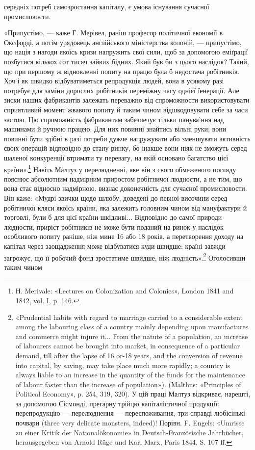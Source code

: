 \parcont{}  %
середніх потреб самозростання капіталу, є умова існування сучасної
промисловости.

«Припустімо, — каже Г. Мерівел, раніш професор політичної
економії в Оксфорді, а потім урядовець англійського міністерства
колоній, — припустімо, що нація з нагоди якоїсь кризи напружить
свої сили, щоб за допомогою еміґрації позбутися кількох сот
тисяч зайвих бідних. Який був би з цього наслідок? Такий, що
при першому ж відновленні попиту на працю була б недостача
робітників. Хоч і як швидко відбуватиметься репродукція людей,
вона в усякому разі потребує для заміни дорослих робітників
переміжну часу однієї їенерації. Але зиски наших фабрикантів
залежать переважно від спроможности використовувати сприятливий
момент жвавого попиту й таким чином відшкодовувати
себе за часи застою. Цю спроможність фабрикантам забезпечує
тільки панува'ння над машинами й ручною працею. Для них
повинні знайтись вільні руки; вони повинні бути здібні в разі
потреби дужче напружувати або зменшувати активність своїх
операцій відповідно до стану ринку, бо інакше вони ніяк не зможуть
серед шаленої конкуренції втримати ту перевагу, на якій
основано багатство цієї країни».\footnote{
Н. Merivale: «Lectures on Colonization and Colonies», London 1841
and 1842, vol. I, p. 146.
} Навіть Малтуз у перелюдненні,
яке він з свого обмеженого погляду пояснює абсолютним
надмірним приростом робітничої людности, а не тим, що вона
стає відносно надмірною, визнає доконечність для сучасної промисловости.
Він каже: «Мудрі звички щодо шлюбу, доведені
до певної височини серед робітничої кляси якоїсь країни, яка
залежить головним чином від мануфактури й торговлі, були б
для цієї країни шкідливі... Відповідно до самої природи людности,
приріст робітників не може бути поданий на ринок у наслідок
особливого попиту раніше, ніж мине 16 або 18 років, а перетворення
доходу на капітал через заощадження може відбуватися
куди швидше; країні завжди загрожує, що її робочий фонд зростатиме
швидше, ніж людність».\footnote{
«Prudential habits with regard to marriage carried to a considerable
extent among the labouring class of a country mainly depending upon manufactures
and commerce might injure it... From the natute of a population,
an increase of labourers cannot be brought into market, in consequence
of a particular demand, till after the lapse of 16 or-18 years, and the conversion
of revenue into capital, by saving, may take place much more rapidly;
a country is always liable to an increase in the quantity of the funds
for the maintenance of labour faster than the increase of population»).
(Malthus: «Principles of Political Economy», p. 254, 319, 320). У цій праці
Малтуз відкриває, нарешті, за допомогою Сісмонді, прегарну трійцю капіталістичної
продукції: перепродукцію — перелюднення — переспоживання,
три справді любісінькі почвари (three very delicate monsters, indeed)!
Порівн. F. Engels: «Umrisse zu einer Kritik der Nationalökonomie» in
Deutsch-Französische Jahrbücher, herausgegeben von Arnold Rüge
und Karl Marx, Paris 1844, S. 107 ff.
} Оголосивши таким чином
